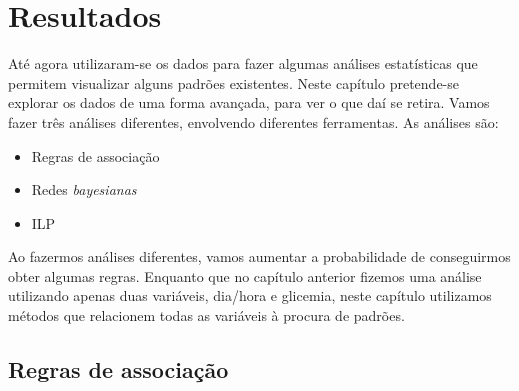 \chapter{Resultados}\label{chap:results}

Até agora utilizaram-se os dados para fazer algumas análises estatísticas que permitem visualizar alguns padrões existentes. Neste capítulo pretende-se explorar os dados de uma forma avançada, para ver o que daí se retira. Vamos fazer três análises diferentes, envolvendo diferentes ferramentas. As análises são:

\begin{itemize}
\item Regras de associação
\item Redes \textit{bayesianas}
\item ILP
\end{itemize}

Ao fazermos análises diferentes, vamos aumentar a probabilidade de conseguirmos obter algumas regras. Enquanto que no capítulo anterior fizemos uma análise utilizando apenas duas variáveis, dia/hora e glicemia, neste capítulo utilizamos métodos que relacionem todas as variáveis à procura de padrões.


\section{Regras de associação}\label{sec:regras}

